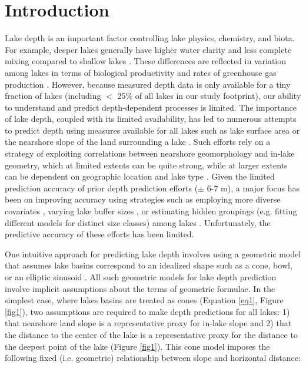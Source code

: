 \documentclass[draft]{agujournal2019}
\begin{document}
\section{Introduction}
\noindent
\noindent
Lake depth is an important factor controlling lake physics, chemistry, and biota. For example, deeper lakes generally have higher water clarity and less complete mixing compared to shallow lakes \cite{feeEffectsLakeSize1996, readSimulating2368Temperate2014}. These differences are reflected in variation among lakes in terms of biological productivity \cite{qinWaterDepthUnderpins2020} and rates of greenhouse gas production \cite{liSignificantContributionLake2020}. However, because measured depth data is only available for a tiny fraction of lakes (including $<$ 25\% of all lakes in our study footprint), our ability to understand and predict depth-dependent processes is limited. The importance of lake depth, coupled with its limited availability, has led to numerous attempts to predict depth using measures available for all lakes such as lake surface area or the nearshore slope of the land surrounding a lake \cite{heathcotePredictingBathymetricFeatures2015, oliver2016prediction, sobekPredictingDepthVolume2011}. Such efforts rely on a strategy of exploiting correlations between nearshore geomorphology and in-lake geometry, which at limited extents can be quite strong, while at larger extents can be dependent on geographic location and lake type \cite{oliver2016prediction, branstrator2009origins}.
Given the limited prediction accuracy of prior depth prediction efforts ($\pm$ 6-7 m), a major focus has been on improving accuracy using strategies such as employing more diverse covariates \cite{oliver2016prediction}, varying lake buffer sizes \cite{heathcotePredictingBathymetricFeatures2015}, or estimating hidden groupings (e.g. fitting different models for distinct size classes) among lakes \cite{caelVolumeMeanDepth2017, sobekPredictingDepthVolume2011}. Unfortunately, the predictive accuracy of these efforts has been limited.

One intuitive approach for predicting lake depth involves using a geometric model that assumes lake basins correspond to an idealized shape such as a cone, bowl, or an elliptic sinusoid \cite{getiranaDerivingThreeDimensional2018, hollisterPredictingMaximumLake2011, neumannMaximumDepthAverage1959, yigzawNewGlobalStorage2018}. All such geometric models for lake depth prediction involve implicit assumptions about the terms of geometric formulae. In the simplest case, where lakes basins are treated as cones (Equation \ref{eq1}, Figure \ref{fig1}), two assumptions are required to make depth predictions for all lakes: 1) that nearshore land slope is a representative proxy for in-lake slope and 2) that the distance to the center of the lake is a representative proxy for the distance to the deepest point of the lake (Figure \ref{fig1}). This cone model imposes the following fixed (i.e. geometric) relationship between slope and horizontal distance:
\end{document}
